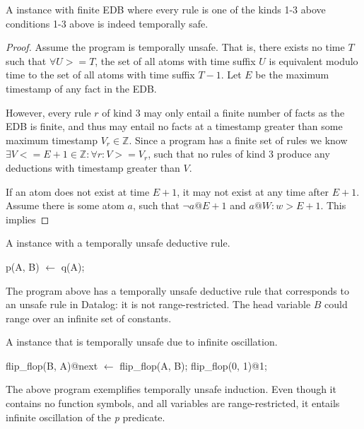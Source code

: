 \begin{lemma} 
%
A \slang instance with finite EDB where every rule is one of the kinds 1-3
above conditions 1-3 above is indeed temporally safe.
%
\end{lemma}
%
\begin{proof}
%
Assume the program is temporally unsafe.  That is, there exists no time $T$
such that $\forall U >= T$, the set of all atoms with time suffix $U$ is
equivalent modulo time to the set of all atoms with time suffix $T-1$.  Let $E$
be the maximum timestamp of any fact in the EDB.

However, every rule $r$ of kind 3 may only entail a finite number of facts as
the EDB is finite, and thus may entail no facts at a timestamp greater than
some maximum timestamp $V_r \in \mathbb{Z}$.  Since a \slang program has a
finite set of rules we know $\exists V <= E+1 \in \mathbb{Z} : \forall r: V >= V_r$,
such that no rules of kind 3 produce any deductions with timestamp greater than
$V$.

If an atom does not exist at time $E+1$, it may not exist at any time after $E+1$.
Assume there is some atom $a$, such that $\lnot a@E+1$ and $a@W : w>E+1$.  This
implies 

%
\end{proof}

\begin{example}
A \slang instance with a temporally unsafe deductive rule.


\begin{Dedalus}
p(A, B) \(\leftarrow\) q(A);
\end{Dedalus}

The program above has a temporally unsafe deductive rule that corresponds to an
unsafe rule in Datalog: it is not range-restricted.  The head variable $B$
could range over an infinite set of constants.
\end{example}


\begin{example} 
%
A \slang instance that is temporally unsafe due to infinite oscillation.

\begin{Dedalus}
flip\_flop(B, A)@next \(\leftarrow\) flip\_flop(A, B);
flip\_flop(0, 1)@1;
\end{Dedalus}

The above program exemplifies temporally unsafe induction. Even though it
contains no function symbols, and all variables are range-restricted, it
entails infinite oscillation of the \emph{p} predicate.  
\end{example}

